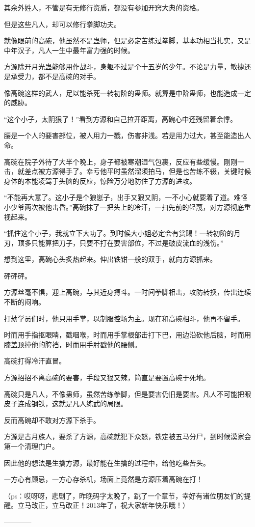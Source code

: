 \begin{this_body}
其余外姓人，不管是有无修行资质，都没有参加开窍大典的资格。

但是这些凡人，却可以修行拳脚功夫。

就像眼前的高碗，他虽然不是蛊师，但是必定苦练过拳脚，基本功相当扎实，又是中年汉子，凡人一生中最年富力强的时候。

方源除开月光蛊能够用作战斗，身躯不过是个十五岁的少年。不论是力量，敏捷还是承受力，都不是高碗的对手。

像高碗这样的武人，足以能杀死一转初阶的蛊师。就算是中阶蛊师，也能造成一定的威胁。

“这个小子，太阴狠了！”看到方源和自己拉开距离，高碗心中还残留着余悸。

腰是一个人的要害部位，被人用力一戳，伤害非浅。若是用力过大，甚至能造出人命。

高碗在院子外待了大半个晚上，身子都被寒潮湿气包裹，反应有些缓慢。刚刚一击，就差点被方源得手了。幸亏他平时虽然溜须拍马，但是也苦练不辍，关键时候身体的本能凌驾于头脑的反应，惊险万分地防住了方源的进攻。

“不能再大意了。这小子是个狼崽子，出手又狠又阴，一不小心就要着了道。难怪小少爷两次被他击昏。”高碗抹了一把头上的冷汗，一扫先前的轻蔑，对方源彻底重视起来。

“抓住这个小子，我就立下大功了。到时候大小姐必定会有赏赐！一转初阶的月刃，顶多只能算把刀子，只要不打在要害部位，不过是破皮流血的浅伤。”

想到这里，高碗心头炙热起来。伸出铁钳一般的双手，就向方源抓来。

砰砰砰。

方源丝毫不惧，迎上高碗，与其近身搏斗。一时间拳脚相击，攻防转换，传出连续不断的闷响。

打劫学员们时，他只用手掌，以制服控场为主。现在和高碗相斗，他再不留手。

时而用手指抠眼睛，戳咽喉，时而用手掌根部击打下巴，用边沿砍他后脑，时而用膝盖顶撞他的胯裆，时而用手肘戳他的腰侧。

高碗打得冷汗直冒。

方源招招不离高碗的要害，手段又狠又辣，简直是要置高碗于死地。

高碗只是凡人，不像蛊师，虽然苦练拳脚，但是要害仍旧是要害。凡人不可能把眼皮子连成钢铁，这就是凡人练武的局限。

反而高碗却不敢对方源下杀手。

方源是古月族人，要杀了方源，高碗就犯下众怒，铁定被五马分尸，到时候漠家会第一个清理门户。

因此他的想法是生擒方源，最好能在生擒的过程中，给他吃些苦头。

一方心有顾忌，一方心存杀机，场面上竟然是方源压着高碗在打！

（ps：哎呀呀，悲剧了，昨晚码字太晚了，跳了一个章节，幸好有诸位朋友们的提醒。立马改正，立马改正！2013年了，祝大家新年快乐哦！）

------------

\end{this_body}

